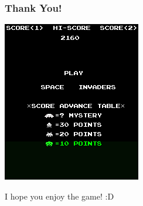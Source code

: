 \documentclass{beamer}
\newcommand{\<}[1]{\`#1}
\begin{document}
\begin{frame}
  \frametitle{Thank You!}
  \begin{center}
    \includegraphics[scale=0.4]{intro-movie2}
  \end{center}
  I hope you enjoy the game! :D
\end{frame}
\end{document}
